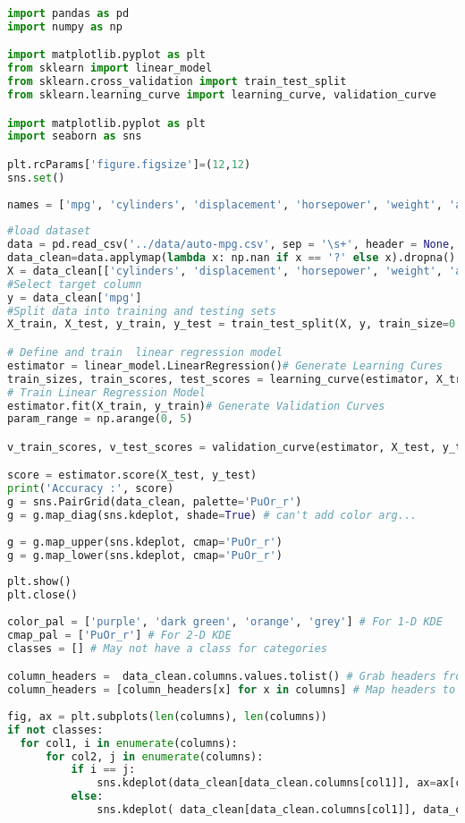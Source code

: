 \begin{lstlisting}[language=python]
import pandas as pd
import numpy as np

import matplotlib.pyplot as plt
from sklearn import linear_model
from sklearn.cross_validation import train_test_split
from sklearn.learning_curve import learning_curve, validation_curve

import matplotlib.pyplot as plt
import seaborn as sns

plt.rcParams['figure.figsize']=(12,12)
sns.set()
 
names = ['mpg', 'cylinders', 'displacement', 'horsepower', 'weight', 'acceleration', 'model_year', 'origin', 'car_name']
 
#load dataset
data = pd.read_csv('../data/auto-mpg.csv', sep = '\s+', header = None, names = names)
data_clean=data.applymap(lambda x: np.nan if x == '?' else x).dropna()
X = data_clean[['cylinders', 'displacement', 'horsepower', 'weight', 'acceleration', 'model_year', "origin"]]
#Select target column
y = data_clean['mpg']
#Split data into training and testing sets
X_train, X_test, y_train, y_test = train_test_split(X, y, train_size=0.8, test_size=0.2)

# Define and train  linear regression model
estimator = linear_model.LinearRegression()# Generate Learning Cures
train_sizes, train_scores, test_scores = learning_curve(estimator, X_train, y_train) 
# Train Linear Regression Model
estimator.fit(X_train, y_train)# Generate Validation Curves
param_range = np.arange(0, 5)

v_train_scores, v_test_scores = validation_curve(estimator, X_test, y_test, param_name='normalize', param_range=param_range)

score = estimator.score(X_test, y_test)
print('Accuracy :', score)
g = sns.PairGrid(data_clean, palette='PuOr_r')
g = g.map_diag(sns.kdeplot, shade=True) # can't add color arg...
 
g = g.map_upper(sns.kdeplot, cmap='PuOr_r')
g = g.map_lower(sns.kdeplot, cmap='PuOr_r')
 
plt.show()
plt.close()
 
color_pal = ['purple', 'dark green', 'orange', 'grey'] # For 1-D KDE
cmap_pal = ['PuOr_r'] # For 2-D KDE
classes = [] # May not have a class for categories

column_headers =  data_clean.columns.values.tolist() # Grab headers from df
column_headers = [column_headers[x] for x in columns] # Map headers to indices selected
 
fig, ax = plt.subplots(len(columns), len(columns))
if not classes:
  for col1, i in enumerate(columns):
      for col2, j in enumerate(columns):
          if i == j:
              sns.kdeplot(data_clean[data_clean.columns[col1]], ax=ax[col1][col2], color=color_pal[0], shade=True, legend=False)
          else:
              sns.kdeplot( data_clean[data_clean.columns[col1]], data_clean[data_clean.columns[col2]], ax=ax[col1][col2], cmap=cmap_pal[0])


\end{lstlisting}
